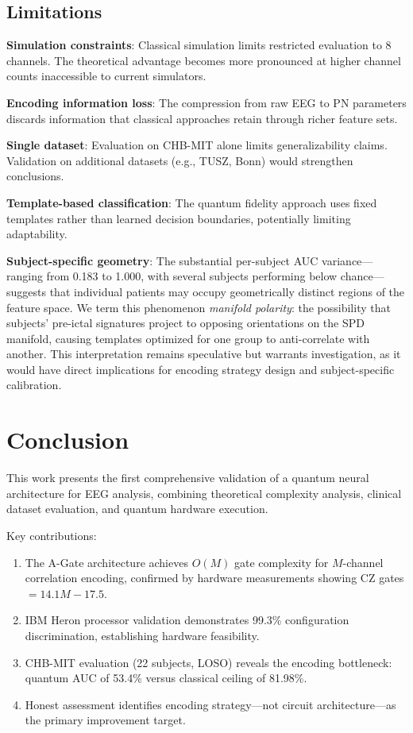 \documentclass[pdflatex,sn-mathphys-num]{sn-jnl}
\begin{document}
\subsection{Limitations}
\label{sec:limitations}

\textbf{Simulation constraints}: Classical simulation limits restricted evaluation to 8 channels. The theoretical advantage becomes more pronounced at higher channel counts inaccessible to current simulators.

\textbf{Encoding information loss}: The compression from raw EEG to PN parameters discards information that classical approaches retain through richer feature sets.

\textbf{Single dataset}: Evaluation on CHB-MIT alone limits generalizability claims. Validation on additional datasets (e.g., TUSZ, Bonn) would strengthen conclusions.

\textbf{Template-based classification}: The quantum fidelity approach uses fixed templates rather than learned decision boundaries, potentially limiting adaptability.

\textbf{Subject-specific geometry}: The substantial per-subject AUC variance---ranging from 0.183 to 1.000, with several subjects performing below chance---suggests that individual patients may occupy geometrically distinct regions of the feature space. We term this phenomenon \emph{manifold polarity}: the possibility that subjects' pre-ictal signatures project to opposing orientations on the SPD manifold, causing templates optimized for one group to anti-correlate with another. This interpretation remains speculative but warrants investigation, as it would have direct implications for encoding strategy design and subject-specific calibration.

\section{Conclusion}
\label{sec:conclusion}

This work presents the first comprehensive validation of a quantum neural architecture for EEG analysis, combining theoretical complexity analysis, clinical dataset evaluation, and quantum hardware execution.

Key contributions:
\begin{enumerate}
    \item The A-Gate architecture achieves $O(M)$ gate complexity for $M$-channel correlation encoding, confirmed by hardware measurements showing CZ gates $= 14.1M - 17.5$.
    \item IBM Heron processor validation demonstrates 99.3\% configuration discrimination, establishing hardware feasibility.
    \item CHB-MIT evaluation (22 subjects, LOSO) reveals the encoding bottleneck: quantum AUC of 53.4\% versus classical ceiling of 81.98\%.
    \item Honest assessment identifies encoding strategy---not circuit architecture---as the primary improvement target.
\end{enumerate}
\end{document}
